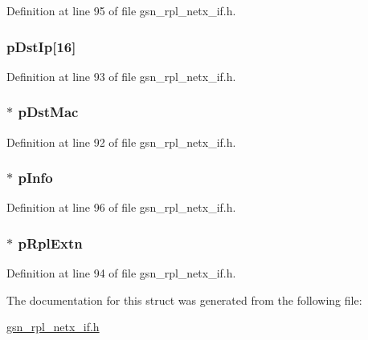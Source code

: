 Definition at line 95 of file gsn\_\-rpl\_\-netx\_\-if.h.

\hypertarget{a00208_a99207703054651b2afadc4dc775510de}{
\subsubsection[{pDstIp}]{ {\bf pDstIp}\mbox{[}16\mbox{]}}}
\label{a00208_a99207703054651b2afadc4dc775510de}


Definition at line 93 of file gsn\_\-rpl\_\-netx\_\-if.h.

\hypertarget{a00208_a22af0702ae13ea47e1e69feafa02e7cb}{
\subsubsection[{pDstMac}]{$\ast$ {\bf pDstMac}}}
\label{a00208_a22af0702ae13ea47e1e69feafa02e7cb}


Definition at line 92 of file gsn\_\-rpl\_\-netx\_\-if.h.

\hypertarget{a00208_a24c66f5468b12f00f3e7857a6845fcb8}{
\subsubsection[{pInfo}]{$\ast$ {\bf pInfo}}}
\label{a00208_a24c66f5468b12f00f3e7857a6845fcb8}


Definition at line 96 of file gsn\_\-rpl\_\-netx\_\-if.h.

\hypertarget{a00208_aef128c775a69f4460fbba077538011f8}{
\subsubsection[{pRplExtn}]{$\ast$ {\bf pRplExtn}}}
\label{a00208_aef128c775a69f4460fbba077538011f8}


Definition at line 94 of file gsn\_\-rpl\_\-netx\_\-if.h.



The documentation for this struct was generated from the following file:\begin{DoxyCompactItemize}
\item 
\hyperlink{a00580}{gsn\_\-rpl\_\-netx\_\-if.h}\end{DoxyCompactItemize}
